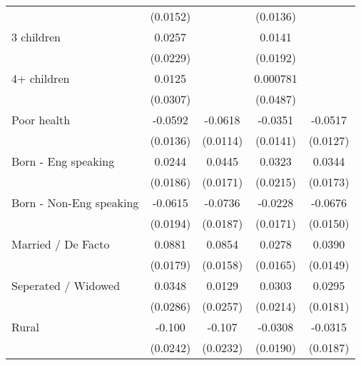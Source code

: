 {\begin{tabular}{l*{4}{c}}
                    &    (0.0152)         &                     &    (0.0136)         &                     \\
[1em]
3 children          &      0.0257         &                     &      0.0141         &                     \\
                    &    (0.0229)         &                     &    (0.0192)         &                     \\
[1em]
4+ children         &      0.0125         &                     &    0.000781         &                     \\
                    &    (0.0307)         &                     &    (0.0487)         &                     \\
[1em]
Poor health         &     -0.0592\sym{***}&     -0.0618\sym{***}&     -0.0351\sym{*}  &     -0.0517\sym{***}\\
                    &    (0.0136)         &    (0.0114)         &    (0.0141)         &    (0.0127)         \\
[1em]
Born - Eng speaking &      0.0244         &      0.0445\sym{**} &      0.0323         &      0.0344\sym{*}  \\
                    &    (0.0186)         &    (0.0171)         &    (0.0215)         &    (0.0173)         \\
[1em]
Born - Non-Eng speaking&     -0.0615\sym{**} &     -0.0736\sym{***}&     -0.0228         &     -0.0676\sym{***}\\
                    &    (0.0194)         &    (0.0187)         &    (0.0171)         &    (0.0150)         \\
[1em]
Married / De Facto  &      0.0881\sym{***}&      0.0854\sym{***}&      0.0278         &      0.0390\sym{**} \\
                    &    (0.0179)         &    (0.0158)         &    (0.0165)         &    (0.0149)         \\
[1em]
Seperated / Widowed &      0.0348         &      0.0129         &      0.0303         &      0.0295         \\
                    &    (0.0286)         &    (0.0257)         &    (0.0214)         &    (0.0181)         \\
[1em]
Rural               &      -0.100\sym{***}&      -0.107\sym{***}&     -0.0308         &     -0.0315         \\
                    &    (0.0242)         &    (0.0232)         &    (0.0190)         &    (0.0187)         \\

\end{tabular}}
